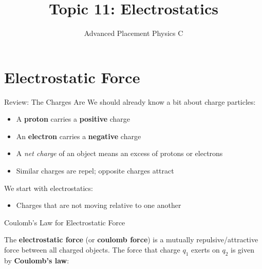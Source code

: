 \documentclass[12pt,aspectratio=169]{beamer}
\title{Topic 11: Electrostatics}
\subtitle{Advanced Placement Physics C}
\begin{document}
\begin{frame}
  \maketitle
\end{frame}


\section{Electrostatic Force}

\begin{frame}{Review: The Charges Are}
  We should already know a bit about charge particles:
  \begin{itemize}
  \item A \textbf{proton} carries a \textbf{positive} charge
  \item An \textbf{electron} carries a \textbf{negative} charge
  \item A \emph{net charge} of an object means an excess of protons or electrons
  \item Similar charges are repel; opposite charges attract
  \end{itemize}

  \vspace{.2in}We start with electrostatics:
  \begin{itemize}
  \item Charges that are not moving relative to one another
  \end{itemize}
\end{frame}



\begin{frame}{Coulomb's Law for Electrostatic Force}
  \begin{center}
  \end{center}
  The \textbf{electrostatic force} (or \textbf{coulomb force}) is a mutually
  repulsive/attractive force between all charged objects. The force that charge
  $q_1$ exerts on $q_2$ is given by \textbf{Coulomb's law}:

\end{frame}
\end{document}
